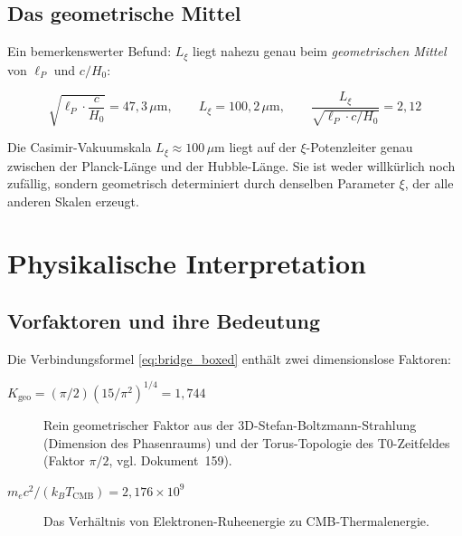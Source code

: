 \subsection{Das geometrische Mittel}

Ein bemerkenswerter Befund: $L_\xi$ liegt nahezu genau beim
\emph{geometrischen Mittel} von $\ell_P$ und $c/H_0$:

\begin{equation}
    \sqrt{\ell_P \cdot \frac{c}{H_0}} = 47{,}3\,\mu\text{m},
    \qquad
    L_\xi = 100{,}2\,\mu\text{m},
    \qquad
    \frac{L_\xi}{\sqrt{\ell_P \cdot c/H_0}} = 2{,}12
    \label{eq:geom_mean}
\end{equation}

\begin{insightBox}
    Die Casimir-Vakuumskala $L_\xi \approx 100\,\mu\text{m}$ liegt auf der
    $\xi$-Potenzleiter genau zwischen der Planck-Länge und der Hubble-Länge.
    Sie ist weder willkürlich noch zufällig, sondern geometrisch determiniert
    durch denselben Parameter $\xi$, der alle anderen Skalen erzeugt.
\end{insightBox}

\section{Physikalische Interpretation}
\label{sec:interpretation}

\subsection{Vorfaktoren und ihre Bedeutung}

Die Verbindungsformel \eqref{eq:bridge_boxed} enthält zwei dimensionslose Faktoren:

\begin{description}
    \item[$K_\text{geo} = (\pi/2)(15/\pi^2)^{1/4} = 1{,}744$]
        Rein geometrischer Faktor aus der 3D-Stefan-Boltzmann-Strahlung
        (Dimension des Phasenraums) und der Torus-Topologie des T0-Zeitfeldes
        (Faktor $\pi/2$, vgl. Dokument~159).

    \item[$m_e c^2 / (k_B T_\text{CMB}) = 2{,}176 \times 10^9$]
        Das Verhältnis von Elektronen-Ruheenergie zu CMB-Thermalenergie.
\end{description}

